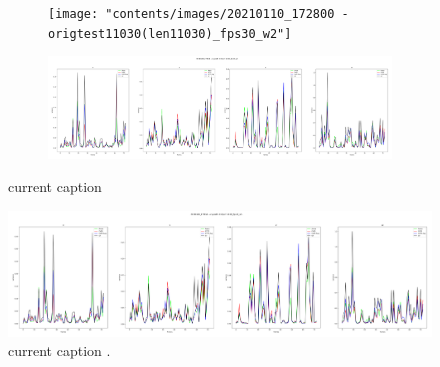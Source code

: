\begin{figure}[!htb]
	\begin{center}
		\begin{subfigure}[h]{0.30\textwidth}
			\centering
			\texttt{[image: "contents/images/20210110\_172800 - origtest11030(len11030)\_fps30\_w2"]}
		\end{subfigure}
		\hfill
		\begin{subfigure}[h]{0.68\textwidth}
			\centering
			\includegraphics[width=\textwidth]{"contents/images/20210110_172810 - origtest11030(len11030)_fps30_w5"}
		\end{subfigure}
	\end{center}
	\vspace{-0.5cm}
	\caption[list of figures caption]{current caption}
	\label{fig:task1}
\end{figure}

\lipsum[2]

\bigskip

\begin{figure}[!htb]
	\centering
	\includegraphics[width=.55\textwidth]{"contents/images/20210110_172810 - origtest11030(len11030)_fps30_w5"}
	\caption[list of figures caption]{current caption \cite[][]{shojaei2011adaptive}.}
	\label{fig:differentialdrive}
\end{figure}

\lipsum[2]

\bigskip

